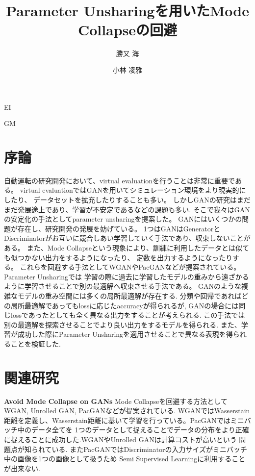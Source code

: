 \documentclass[techrep, submit, noauthor,preface]{ipsj}
\begin{document}
\title{Parameter Unsharingを用いたMode Collapseの回避}


\author{勝又 海}{}{EI}
\author{小林 凌雅}{}{GM}

\maketitle
\thispagestyle{empty} 
\begin{abstract}

\end{abstract}

\section{序論}

自動運転の研究開発において、virtual evaluationを行うことは非常に重要である。
virtual evaluationではGANを用いてシミュレーション環境をより現実的にしたり、
データセットを拡充したりすることも多い。
しかしGANの研究はまだまだ発展途上であり、学習が不安定であるなどの課題も多い.
そこで我々はGANの安定化の手法としてparameter unsharingを提案した。
GANにはいくつかの問題が存在し、研究開発の発展を妨げている。
1つはGANはGeneratorとDiscriminatorがお互いに競合しあい学習していく手法であり、収束しないことがある。
また、Mode Collapseという現象により、訓練に利用したデータとは似ても似つかない出力をするようになったり、
定数を出力するようになったりする。
これらを回避する手法としてWGANやPacGANなどが提案されている。
Parameter Unsharingでは
学習の際に過去に学習したモデルの重みから遠ざかるように学習させることで別の最適解へ収束させる手法である。
GANのような複雑なモデルの重み空間には多くの局所最適解が存在する.
分類や回帰であればどの局所最適解であってもlossに応じたaccuracyが得られるが, 
GANの場合には同じlossであったとしても全く異なる出力をすることが考えられる.
この手法では別の最適解を探索させることでより良い出力をするモデルを得られる.
また、学習が成功した際にParameter Unsharingを適用させることで異なる表現を得られることを検証した.

\section{関連研究}

{\bf Avoid Mode Collapse on GANs} Mode Collapseを回避する方法としてWGAN, Unrolled GAN, PacGANなどが提案されている.
WGANではWasserstain距離を定義し、Wasserstain距離に基いて学習を行っている。PacGANではミニバッチ中のデータ全てを
1つのデータとして捉えることでデータの分布をより正確に捉えることに成功した.WGANやUnrolled GANは計算コストが高いという
問題点が知られている. またPacGANではDiscriminatorの入力サイズがミニバッチ中の画像を1つの画像として扱うため
Semi Supervised Learningに利用することが出来ない.
\end{document}
